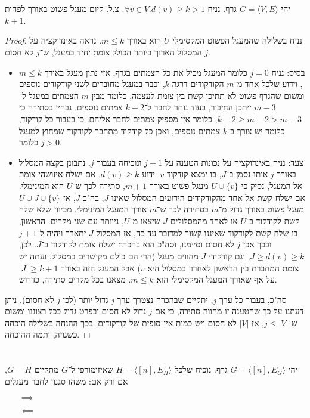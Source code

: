 \documentclass[]{article}
\newcommand\ra    {\rangle}
\newcommand\la    {\langle}
\newcommand\tl    {\tilde}
\begin{document}
	\section{}
	יהי $G = \la V, E \ra$ גרף. נניח $\forall v \in V. d(v) \ge k >1$. צ.ל. קיום מעגל פשוט באורך לפחות $k + 1$. 
	\begin{proof}
		נניח בשלילה שהמעגל הפשוט המקסימלי $U$ הוא באורך $m \le k$. נראה באינדוקציה על $j$ המסלול הארוך ביותר הכולל צומת יחיד במעגל, ש־$j$ לא חסום.
		\begin{itemize}
			\item בסיס: נניח $j = 0$ כלומר המעגל מכיל את כל הצמתים בגרף, אזי נתון מעגל באורך $m \le k$, וידוע שלכל אחד מ־$m$ הקודקודים דרגה $k$, וכבר במעגל מחוברים לשני קודקודים נוספים ומשום שהגרף פשוט לא תתיכן קשת בין צומת לעצמה, כלומר מבין $m$ הצמתים במעגל ל־$m - 3$ ייתכן החיבור, בעוד נותר לחבר ל־$k - 2$ צמתים נוספים. נבחין בסתירה כי $k - 2 \ge m - 2 > m - 3$, כלומר אין מספיק צמתים לחבר אליהם. כן בעבור כל קודקוד, כלומר יש צורך ב־$k$ צמתים נוספים, ואכן כל קודקוד מתחבר לקודקוד שמחוץ למעגל כלומר $j > 0$. 
			\item צעד: נניח באינדוקציה על נכונות הטענה על $j - 1$ ונוכיחה בעבור $j$. נתבונן בקצה המסלול באורך $j$ אותו נסמן ב־$J$, בו ימצא קודקוד $v$. ידוע $d(v) \ge k$. אם ישלח איזושהי צומת אל המעגל, נסיק כי $U \cup \{v\}$ מעגל פשוט באורך $m + 1$, סתירה לכך ש־$U$ הוא המינימלי. אם ישלח קשת אל אחד מהקודקודים הידועים המסלול שאינו $J$, בה"כ $\tl J$, אז $U \cup J \cup \{v\}$ מעגל פשוט באורך גדול מ־$m$ בסתירה לכך ש־$m$ אורך המעגל המינימלי. מכיוון שלא שלח קשת לקודקוד ב־$U$ או לאחד מהמסלולים $\tl J$ שיצאו מ־$U$, ניוותר עם שני מקרים: הראשון, בו שלח קשת לקודקוד שאיננו קשור למדובר עד כה, אז המסלול $J$ יתארך ויהיה ל־$j + 1$ ובכך אכן $j$ לא חסום וסיימנו, וסה"כ הוא בהכרח ישלח צומת לקודקוד ב־$J$. לכן, $J \ge d(v) \ge k$, וגם קודקודי $J$ מהווים מעגל (הרי הם כולם מקושרים במסלול, ועתה יש צומת המחברת בין הראשון לאחרון במסלול היא $v$) אבל המעגל הזה באורך $|J| \ge k + 1$ על אף שאורך המעגל המקסימלי הוא $m \le k$. מצאנו בכל מקרים סתירה, כדרוש. 
		\end{itemize}
		סה"כ, בעבור כל ערך $j$, יתקיים שבהכרח נצטרך ערך $j$ גדול יותר (לכן $j$ לא חסום). ניתן דעתנו על כך שהטענה זו מהווה סתירה, כי אם $j$ גדול לא חסום ובפרט גדול ככל רצוננו ומשום ש־$j \le |V|$, אז  $|V|$ לא חסום ויש כמות אין־סופית של קודקודים. בכך ההנחה בשלילה הוכחה כשגויה, ותמה ההוכחה. 
	\end{proof}
	\section{}
	יהי $G = \la [n], E_G \ra$ גרף. נוכיח שלכל $H = \la [n], E_H \ra$ שאיזימורפי ל־$G$ מתקיים $G = H$, אם ורק אם:
	משהו סגנון לחבר מעגלים
	\begin{itemize}
		\item[$\implies$]
		\item[$\impliedby$]
	\end{itemize}
\end{document}
